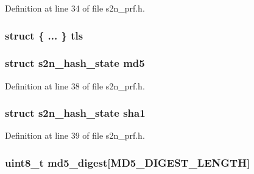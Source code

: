 Definition at line 34 of file s2n\+\_\+prf.\+h.

\subsubsection[{\texorpdfstring{tls}{tls}}]{\setlength{\rightskip}{0pt plus 5cm}struct \{ ... \}   tls}\hypertarget{unions2n__prf__working__space_a1ced0527b66f71d400b770e8c811e789}{}\label{unions2n__prf__working__space_a1ced0527b66f71d400b770e8c811e789}
\subsubsection[{\texorpdfstring{md5}{md5}}]{\setlength{\rightskip}{0pt plus 5cm}struct {\bf s2n\+\_\+hash\+\_\+state} md5}\hypertarget{unions2n__prf__working__space_aef86a1eeef902f13a68011b824cfe662}{}\label{unions2n__prf__working__space_aef86a1eeef902f13a68011b824cfe662}


Definition at line 38 of file s2n\+\_\+prf.\+h.

\subsubsection[{\texorpdfstring{sha1}{sha1}}]{\setlength{\rightskip}{0pt plus 5cm}struct {\bf s2n\+\_\+hash\+\_\+state} sha1}\hypertarget{unions2n__prf__working__space_a6cc3a653d5553d51a2c56300e3679a37}{}\label{unions2n__prf__working__space_a6cc3a653d5553d51a2c56300e3679a37}


Definition at line 39 of file s2n\+\_\+prf.\+h.

\subsubsection[{\texorpdfstring{md5\+\_\+digest}{md5_digest}}]{\setlength{\rightskip}{0pt plus 5cm}uint8\+\_\+t md5\+\_\+digest\mbox{[}{\bf M\+D5\+\_\+\+D\+I\+G\+E\+S\+T\+\_\+\+L\+E\+N\+G\+TH}\mbox{]}}\hypertarget{unions2n__prf__working__space_adb2d4929ba397ee1f0014a5c946c4c90}{}\label{unions2n__prf__working__space_adb2d4929ba397ee1f0014a5c946c4c90}


